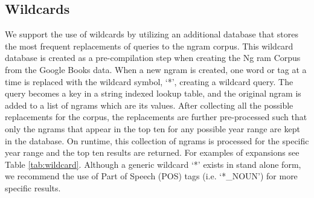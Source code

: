 \documentclass[11pt]{article}
\begin{document}



\subsection{Wildcards}
We support the use of wildcards by utilizing an additional database that stores the most frequent replacements of queries to the ngram corpus. This wildcard database is created as a pre-compilation step when creating the Ng ram Corpus from the Google Books data. When a new ngram is created, one word or tag at a time is replaced with the wildcard symbol, `*', creating a wildcard query. The query becomes a key in a string indexed lookup table, and the original ngram is added to a list of ngrams which are its values. After collecting all the possible replacements for the corpus, the replacements are further pre-processed such that only the ngrams that appear in the top ten for any possible year range are kept in the database. On runtime, this collection of ngrams is processed for the specific year range and the top ten results are returned. For examples of expansions see Table \ref{tab:wildcard}. Although a generic wildcard `*' exists in stand alone form, we recommend the use of Part of Speech (POS) tags (i.e. `*\_NOUN') for more specific results.
\end{document}
